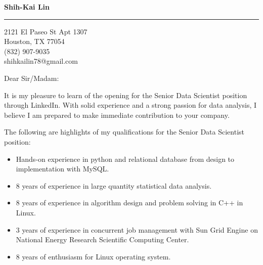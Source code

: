\documentclass{letter} %
\begin{document}
\signature{Shih-Kai Lin}           %
\longindentation=0pt                       %
\let\raggedleft\raggedright                %
 
 
\begin{letter}{}

\begin{center}
{\large\bf Shih-Kai Lin} 
\end{center}
\medskip\hrule height 1pt
\begin{center}
{2121 El Paseo St Apt 1307 \\   Houston, TX 77054 \\ (832) 907-9035 \\ shihkailin78@gmail.com} 
\end{center} \vfill %
 
 
\opening{Dear Sir/Madam:} 
 
\noindent %
It is my pleasure to learn of the opening for the Senior Data Scientist position through LinkedIn. With solid experience and a strong passion for data analysis, I believe I am prepared to make immediate contribution to your company.
 
\noindent %
The following are highlights of my qualifications for the Senior Data Scientist position:
\begin{itemize}
  \item Hands-on experience in python and relational database from design to implementation with MySQL.
	\item 8 years of experience in large quantity statistical data analysis.
	\item 8 years of experience in algorithm design and problem solving in C++ in Linux.
	\item 3 years of experience in concurrent job management with Sun Grid Engine on National Energy Research Scientific Computing Center.
	\item 8 years of enthusiasm for Linux operating system.
\end{itemize}


\end{letter}
\end{document}
